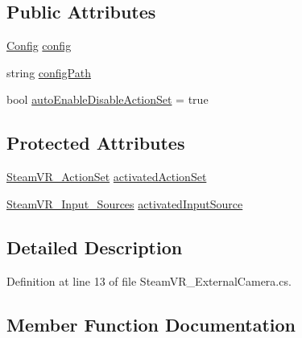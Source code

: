 \subsection*{Public Attributes}
\begin{DoxyCompactItemize}
\item 
\mbox{\hyperlink{struct_valve_1_1_v_r_1_1_steam_v_r___external_camera_1_1_config}{Config}} \mbox{\hyperlink{class_valve_1_1_v_r_1_1_steam_v_r___external_camera_a62a9d8567c47f62e620191b404abc47f}{config}}
\item 
string \mbox{\hyperlink{class_valve_1_1_v_r_1_1_steam_v_r___external_camera_a9d7064ad5953dceb33901e1e03140b2a}{config\+Path}}
\item 
bool \mbox{\hyperlink{class_valve_1_1_v_r_1_1_steam_v_r___external_camera_a9972bde4351b9d77cc1123a2fa1edc83}{auto\+Enable\+Disable\+Action\+Set}} = true
\end{DoxyCompactItemize}
\subsection*{Protected Attributes}
\begin{DoxyCompactItemize}
\item 
\mbox{\hyperlink{class_valve_1_1_v_r_1_1_steam_v_r___action_set}{Steam\+V\+R\+\_\+\+Action\+Set}} \mbox{\hyperlink{class_valve_1_1_v_r_1_1_steam_v_r___external_camera_a15be0393750d7f8ebfef931f360d1acc}{activated\+Action\+Set}}
\item 
\mbox{\hyperlink{namespace_valve_1_1_v_r_a82e5bf501cc3aa155444ee3f0662853f}{Steam\+V\+R\+\_\+\+Input\+\_\+\+Sources}} \mbox{\hyperlink{class_valve_1_1_v_r_1_1_steam_v_r___external_camera_a18ba0e86cb9d7d8ab754f7360dcbac5a}{activated\+Input\+Source}}
\end{DoxyCompactItemize}


\subsection{Detailed Description}


Definition at line 13 of file Steam\+V\+R\+\_\+\+External\+Camera.\+cs.



\subsection{Member Function Documentation}
\mbox{\label{class_valve_1_1_v_r_1_1_steam_v_r___external_camera_a9543c9deb4f7e3ac929dc2e5fa4064c6}} 
